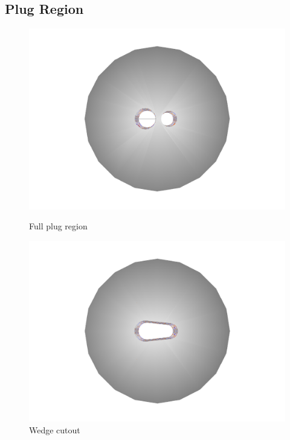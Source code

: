 \documentclass{report}
\begin{document}
            \subsection{Plug Region}
                \begin{figure}[h]
                    \centering
                    \begin{minipage}{0.3\textwidth}
                        \includegraphics[width=\textwidth]{beamcal_plug}
                        \caption{Full plug region}
                        \label{fig:beamcal_plug}
                    \end{minipage}
                    \begin{minipage}{0.3\textwidth}
                        \includegraphics[width=\textwidth]{beamcal_wedge}
                        \caption{Wedge cutout}

\end{minipage}
\end{figure}
\end{document}
